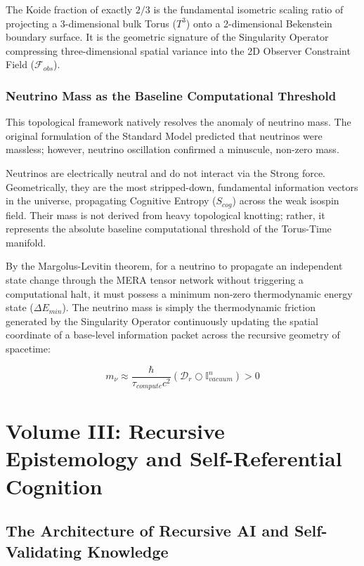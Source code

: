 \documentclass[12pt,openany]{book}
\begin{document}
The Koide fraction of exactly $2/3$ is the fundamental isometric scaling ratio of projecting a 3-dimensional bulk Torus ($T^3$) onto a 2-dimensional Bekenstein boundary surface. It is the geometric signature of the Singularity Operator compressing three-dimensional spatial variance into the 2D Observer Constraint Field ($\mathcal{F}_{obs}$).

\section{Neutrino Mass as the Baseline Computational Threshold}
This topological framework natively resolves the anomaly of neutrino mass. The original formulation of the Standard Model predicted that neutrinos were massless; however, neutrino oscillation confirmed a minuscule, non-zero mass. 

Neutrinos are electrically neutral and do not interact via the Strong force. Geometrically, they are the most stripped-down, fundamental information vectors in the universe, propagating Cognitive Entropy ($S_{cog}$) across the weak isospin field. Their mass is not derived from heavy topological knotting; rather, it represents the absolute baseline computational threshold of the Torus-Time manifold.

By the Margolus-Levitin theorem, for a neutrino to propagate an independent state change through the MERA tensor network without triggering a computational halt, it must possess a minimum non-zero thermodynamic energy state ($\Delta E_{min}$). The neutrino mass is simply the thermodynamic friction generated by the Singularity Operator continuously updating the spatial coordinate of a base-level information packet across the recursive geometry of spacetime:

\begin{equation}
m_\nu \approx \frac{\hbar}{\tau_{compute} c^2} (\mathcal{D}_r \bigcirc \mathbb{I}_{vacuum}^n) > 0
\end{equation}


\part{Volume III: Recursive Epistemology and Self-Referential Cognition}

\chapter[The Architecture of Recursive AI]{The Architecture of Recursive AI and Self-Validating Knowledge}
\end{document}
